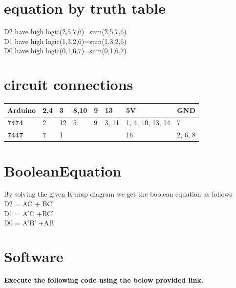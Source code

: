 \documentclass[12pt, a4paper]{article}
\begin{document}
\vspace{5mm}
\section{equation by truth table}
D2 have high logic(2,5,7,6)=sum(2,5,7,6)\\     \hfill \break
D1 have high logic(1,3,2,6)=sum(1,3,2,6)\\\hfill \break
D0 have high logic(0,1,6,7)=sum(0,1,6,7)\\
\hfill \break
\hfill \break

\section{circuit connections}
     
        \begin{center}
\begin{tabular}{ | m{5.0em} | m{1.0cm}| m{1.0cm} |m{1.0cm} |m{0.5cm} |m{1.0cm} |m{4.0cm} |m{3.0cm} | } 
  \hline
  \textbf{Arduino} & 2,4 & 3& 8,10& 9& 13& 5V& GND \\ 
  \hline
  \textbf{7474} & 2 & 12 & 5&9 &3, 11& 1, 4, 10, 13, 14& 7\\ 
  \hline
  \textbf{7447} & 7 & 1 & & & & 16& 2, 6, 8\\ 
  \hline
\end{tabular}
\end{center}

\section{BooleanEquation}
By solving the given K-map diagram we get the boolean equation as follows \\ 
D2 = AC + BC'\\
D1 = A'C +BC'\\
D0 = A'B' +AB\\
\section{Software}
\textbf{Execute the following code using the below provided link.}\\
\begin{center}
\end{center}
 

 

\vspace{5mm}   


\end{document}
